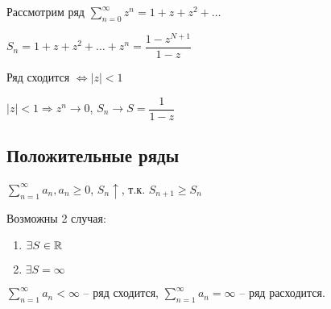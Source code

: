 \begin{example}
\begin{enumerate}
\begin{tikzpicture}[x=0.75pt,y=0.75pt,yscale=-1,xscale=1]
    
    \end{tikzpicture}
    
    Рассмотрим ряд $\sum_{n = 0}^{\infty} z^n = 1 + z + z ^ 2 + \dots$
    

    $S_n = 1 + z + z^2 + \dots + z^n = \dfrac{1 - z^{N + 1}}{1 - z}$

    Ряд сходится $\Leftrightarrow |z| < 1$
    
    $|z| < 1 \Rightarrow z^n \rightarrow 0$, $S_n \rightarrow S = \dfrac{1}{1 - z}$ 
\end{enumerate}
\end{example}
\subsection{Положительные ряды}
$\sum_{n = 1}^{\infty} a_n, a_n \geq 0$, 
$S_n \uparrow$, т.к. $S_{n + 1} \geq S_{n}$

Возможны 2 случая:
\begin{enumerate}
    \item $\exists S \in \RR$
    \item $\exists S = \infty$
\end{enumerate}
\begin{designation}
    $\sum_{n = 1}^{\infty} a_n < \infty$ -- ряд сходится,
    $\sum_{n = 1}^{\infty} a_n = \infty$ -- ряд расходится.
\end{designation}
